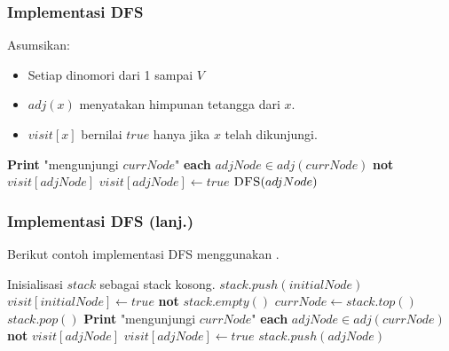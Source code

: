 \begin{frame}[fragile]
\frametitle{Implementasi DFS}
%
Asumsikan:
\begin{itemize}
  \item Setiap \fnode dinomori dari 1 sampai $V$
  \item $adj(x)$ menyatakan himpunan tetangga dari \fnode $x$.
  \item $visit[x]$ bernilai $true$ hanya jika $x$ telah dikunjungi.
\end{itemize}
\begin{codebox}
  \li \textbf{Print} "mengunjungi $currNode$"
  \li \For \textbf{each} $adjNode \in adj(currNode)$ \Do
  \li   \If \textbf{not} $visit[adjNode]$ \Then
  \li     $visit[adjNode] \gets true$
  \li     $\textnormal{\scshape DFS}(adjNode)$
        \End
      \End
\end{codebox}
\end{frame}

\begin{frame}[fragile]
\frametitle{Implementasi DFS (lanj.)}
Berikut contoh implementasi DFS menggunakan .
%
%        
\begin{codebox}
  \li \Comment Inisialisasi $stack$ sebagai stack kosong.
  \li $stack.push(initialNode)$
  \li $visit[initialNode] \gets true$
  \li \While \textbf{not} $stack.empty()$ \Do
  \li   $currNode \gets stack.top()$
  \li   $stack.pop()$
  \li   \textbf{Print} "mengunjungi $currNode$"
  \li   \For \textbf{each} $adjNode \in adj(currNode)$ \Do
  \li     \If \textbf{not} $visit[adjNode]$ \Then
  \li       $visit[adjNode] \gets true$
  \li       $stack.push(adjNode)$
          \End
        \End
      \End
\end{codebox}
\end{frame}


